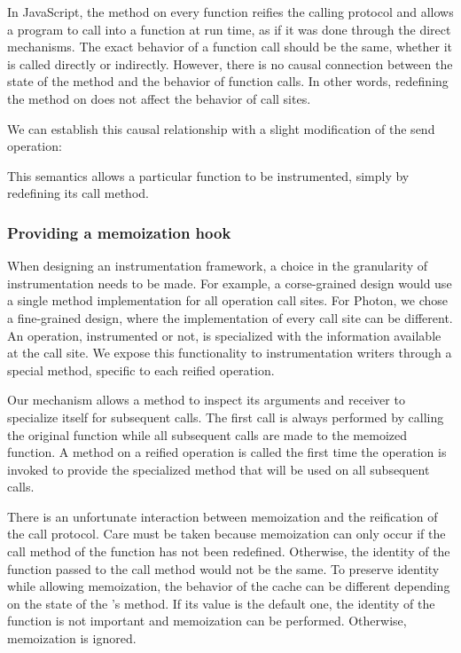 In JavaScript, the  method on every function reifies the calling
protocol and allows a program to call into a function at run time, as if it was
done through the direct mechanisms. The exact behavior of a function call
should be the same, whether it is called directly or indirectly. However, there
is no causal connection between the state of the  method and the
behavior of function calls. In other words, redefining the  method on
 does not affect the behavior of call sites.

We can establish this causal relationship with a slight modification of the
send operation:


This semantics allows a particular function to be instrumented, simply by
redefining its call method.

\subsubsection{Providing a memoization hook}

When designing an instrumentation framework, a choice in the granularity of
instrumentation needs to be made. For example, a corse-grained design would use
a single method implementation for all operation call sites. For Photon, we
chose a fine-grained design, where the implementation of every call site can be
different. An operation, instrumented or not, is specialized with the
information available at the call site. We expose this functionality to
instrumentation writers through a special  method, specific
to each reified operation.

Our mechanism allows a method to inspect its arguments and receiver to
specialize itself for subsequent calls. The first call is always performed by
calling the original function while all subsequent calls are made to the
memoized function. A  method on a reified operation is
called the first time the operation is invoked to provide the specialized
method that will be used on all subsequent calls.

There is an unfortunate interaction between memoization and the reification of
the call protocol. Care must be taken because memoization can only occur if the
call method of the function has not been redefined. Otherwise, the identity of
the function passed to the call method would not be the same. To preserve
identity while allowing memoization, the behavior of the cache can be different
depending on the state of the 's  method. If its
value is the default one, the identity of the function is not important and
memoization can be performed. Otherwise, memoization is ignored.


